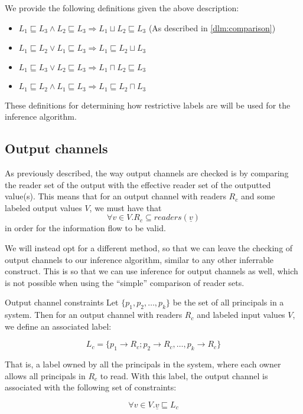 We provide the following definitions given the above description:
\begin{itemize}
  \item $L_1 \sqsubseteq L_3 \wedge L_2 \sqsubseteq L_3 \Rightarrow L_1 \sqcup L_2 \sqsubseteq L_3$ (As described in \cref{dlm:comparison})
  \item $L_1 \sqsubseteq L_2 \vee L_1 \sqsubseteq L_3 \Rightarrow L_1 \sqsubseteq L_2 \sqcup L_3$
  \item $L_1 \sqsubseteq L_3 \vee L_2 \sqsubseteq L_3 \Rightarrow L_1 \sqcap L_2 \sqsubseteq L_3$
  \item $L_1 \sqsubseteq L_2 \wedge L_1 \sqsubseteq L_3 \Rightarrow L_1 \sqsubseteq L_2 \sqcap L_3$
\end{itemize}

These definitions for determining how restrictive labels are will be used for the inference algorithm.

\subsection{Output channels}
As previously described, the way output channels are checked is by comparing the reader set of the output with the effective reader set of the outputted value(s).
This means that for an output channel with readers $R_c$ and some labeled output values $V$, we must have that
\[ \forall v \in V.R_c \subseteq readers(\underline{v}) \]
in order for the information flow to be valid.

We will instead opt for a different method, so that we can leave the checking of output channels to our inference algorithm, similar to any other inferrable construct.
This is so that we can use inference for output channels as well, which is not possible when using the ``simple'' comparison of reader sets.

\begin{definition}{Output channel constraints}\label{dlm:def:outputconstraints}
Let $ \{p_1, p_2, \dots, p_k\} $ be the set of all principals in a system.
Then for an output channel with readers $R_c$ and labeled input values $V$, we define an associated label:

\[ L_c = \{ p_1 \rightarrow R_c; p_2 \rightarrow R_c, \dots, p_k \rightarrow R_c \} \]

That is, a label owned by all the principals in the system, where each owner allows all principals in $R_c$ to read.
With this label, the output channel is associated with the following set of constraints:

\[ \forall v \in V.\underline{v} \sqsubseteq L_c \]
\end{definition}

